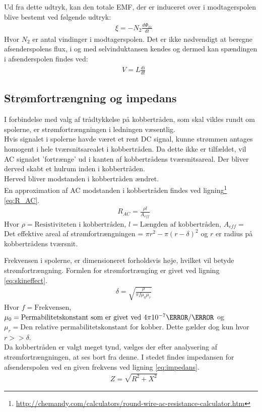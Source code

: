 Ud fra dette udtryk, kan den totale EMF, der er induceret over i modtagerspolen blive bestemt ved følgende udtryk:
\begin{align}
	&\xi = -N_2\frac{d\Phi_{21}}{dt} \label{eq:emf_lille_spole}
\end{align}
Hvor $N_2$ er antal vindinger i modtagerspolen.
Det er ikke nødvendigt at beregne afsenderspolens flux, i og med selvinduktansen kendes og dermed kan spændingen i afsenderspolen findes ved:
\begin{align}
	&V = L\frac{di}{dt} \label{eq:ldidt}
\end{align}
\subsection{Strømfortrængning  og impedans}\label{Sec_skineff.}
I forbindelse med valg af trådtykkelse på kobbertråden, som skal vikles rundt om spolerne, er strømfortrængningen i ledningen væsentlig.\\
Hvis signalet i spolerne havde været et rent DC signal, kunne strømmen antages homogent i hele tværsnitsarealet i kobbertråden.
Da dette ikke er tilfældet, vil AC signalet 'fortrænge' ud i kanten af kobbertrådens tværsnitsareal. 
Der bliver derved skabt et hulrum inden i kobbertråden. \\
Herved bliver modstanden i kobbertråden ændret.\\
En approximation af AC modstanden i kobbertråden findes ved ligning\footnote{\url{http://chemandy.com/calculators/round-wire-ac-resistance-calculator.htm}} \ref{eq:R_AC}.
\begin{align}
	& R_{AC}=\frac{\rho l}{A_{eff}} \label{eq:R_AC}
\end{align}
Hvor $ \rho = \text{Resistiviteten i kobbertråden}$, $l = \text{Længden af kobbertråden}$, $A_{eff} =$ Det effektive areal af strømfortrængningen = $\pi r^2-\pi(r-\delta)^2$ og $r$ er radius på kobbertrådens tværsnit.

Frekvensen i spolerne, er dimensioneret forholdsvis høje, hvilket vil betyde strømfortrængning.
Formlen for strømfortrænging er givet ved ligning \ref{eq:skineffect}.
\begin{align}
	& \delta = \sqrt{\frac{\rho}{\pi f\mu_0\mu_r}} \label{eq:skineffect}
\end{align}
Hvor $f = \text{Frekvensen}$, $\mu_0 = \text{Permabilitetskonstant som er givet ved $4\pi 10^{-7}\henry/\meter$}$ og $\mu_r = \text{Den relative permabilitetskonstant for kobber}$.
Dette gælder dog kun hvor $r>>\delta$. \\
Da kobbertråden er valgt meget tynd, vælges der efter analysering af strømfortrængningen, at ses bort fra denne. 
I stedet findes impedansen for afsenderspolen ved en given frekvens ved ligning \ref{eq:impedans}.
\begin{align}
	& Z=\sqrt{R^2+X^2} \label{eq:impedans}
\end{align}

